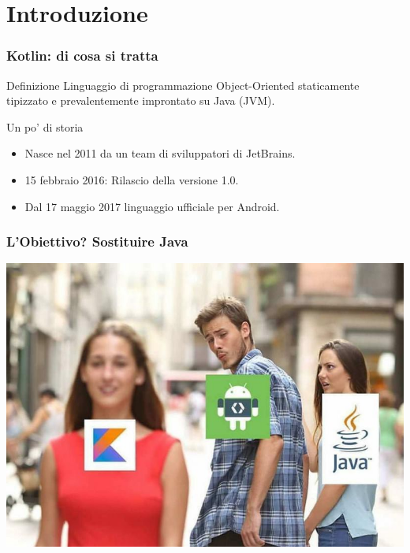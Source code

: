     \begin{frame}
        \titlepage
    \end{frame}
    \begin{frame}
      \tableofcontents
    \end{frame}

    \section{Introduzione}
    \begin{frame}
      \frametitle{Kotlin: di cosa si tratta}
        \begin{block}{Definizione}
          Linguaggio di programmazione Object-Oriented \alert{staticamente tipizzato} e
          prevalentemente improntato su Java (JVM).
        \end{block}

        \bigskip

        \begin{block}{Un po' di storia}
          \begin{itemize}[<+->]
            \item Nasce nel 2011 da un team di sviluppatori di JetBrains.
            \item 15 febbraio 2016: Rilascio della versione 1.0.
            \item Dal 17 maggio 2017 linguaggio \alert{ufficiale} per Android.
          \end{itemize}
        \end{block}
    \end{frame}

    \begin{frame}
      \frametitle{L'Obiettivo? Sostituire Java}
      \begin{center}
        \includegraphics[scale=0.33]{img/KotlinMeme}
      \end{center}
    \end{frame}

